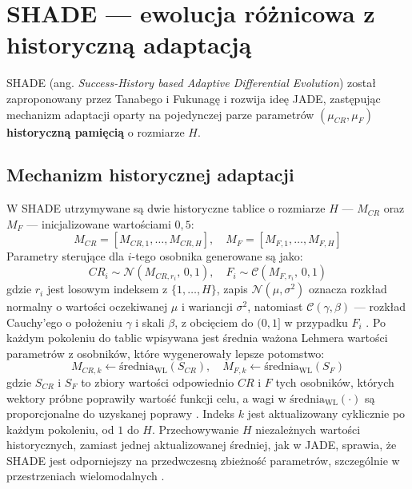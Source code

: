 \section{SHADE --- ewolucja różnicowa z historyczną adaptacją} \label{sec:shade}

SHADE (ang. \textit{Success-History based Adaptive Differential Evolution}) został zaproponowany przez Tanabego i Fukunagę \cite{Tanabe2013SHADE} i rozwija ideę JADE, zastępując mechanizm adaptacji oparty na pojedynczej parze parametrów $(\mu_{CR}, \mu_F)$ \textbf{historyczną pamięcią} o rozmiarze $H$.

\subsection{Mechanizm historycznej adaptacji}
W SHADE utrzymywane są dwie historyczne tablice o rozmiarze $H$ ---
$M_{CR}$ oraz $M_F$ --- inicjalizowane wartościami $0{,}5$:
\[
M_{CR} = [M_{CR,1}, \ldots, M_{CR,H}], \quad M_F = [M_{F,1}, \ldots, M_{F,H}]
\]
Parametry sterujące dla $i$-tego osobnika generowane są jako:
\[
CR_i \sim \mathcal{N}(M_{CR, r_i},\, 0{,}1), \quad F_i \sim \mathcal{C}(M_{F, r_i},\, 0{,}1)
\]
gdzie $r_i$ jest losowym indeksem z $\{1, \ldots, H\}$, zapis $\mathcal{N}(\mu, \sigma^2)$ oznacza rozkład normalny o wartości oczekiwanej $\mu$ i wariancji $\sigma^2$, natomiast $\mathcal{C}(\gamma, \beta)$ --- rozkład Cauchy'ego o położeniu $\gamma$ i skali $\beta$, z obcięciem do $(0, 1]$ w przypadku $F_i$ \cite{Tanabe2013SHADE}.
Po każdym pokoleniu do tablic wpisywana jest średnia ważona Lehmera wartości parametrów z osobników, które wygenerowały lepsze potomstwo:
\[
M_{CR,k} \leftarrow \text{średnia}_{\mathrm{WL}}(S_{CR}), \quad M_{F,k} \leftarrow \text{średnia}_{\mathrm{WL}}(S_F)
\]
gdzie $S_{CR}$ i $S_F$ to zbiory wartości odpowiednio $CR$ i $F$ tych osobników, których wektory próbne poprawiły wartość funkcji celu, a wagi w $\mathrm{średnia}_\mathrm{WL}(\cdot)$ są proporcjonalne do uzyskanej poprawy \cite{Tanabe2013SHADE}. Indeks $k$ jest aktualizowany cyklicznie po każdym pokoleniu, od $1$ do $H$. Przechowywanie $H$ niezależnych wartości historycznych, zamiast jednej aktualizowanej średniej, jak w JADE, sprawia, że SHADE jest odporniejszy na przedwczesną zbieżność parametrów, szczególnie w przestrzeniach wielomodalnych \cite{Tanabe2013SHADE}.

